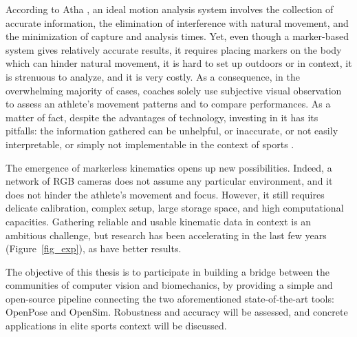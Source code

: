 According to Atha \cite{Atha1984}, an ideal motion analysis system involves the collection of accurate information, the elimination of interference with natural movement, and the minimization of capture and analysis times. Yet, even though a marker-based system gives relatively accurate results, it requires placing markers on the body which can hinder natural movement, it is hard to set up outdoors or in context, it is strenuous to analyze, and it is very costly. As a consequence, in the overwhelming majority of cases, coaches solely use subjective visual observation to assess an athlete's movement patterns and to compare performances. As a matter of fact, despite the advantages of technology, investing in it has its pitfalls: the information gathered can be unhelpful, or inaccurate, or not easily interpretable, or simply not implementable in the context of sports \cite{Windt2020}. 

The emergence of markerless kinematics opens up new possibilities. Indeed, a network of RGB cameras does not assume any particular environment, and it does not hinder the athlete’s movement and focus. However, it still requires delicate calibration, complex setup, large storage space, and high computational capacities. Gathering reliable and usable kinematic data in context is an ambitious challenge, but research has been accelerating in the last few years (Figure~\ref{fig_exp}), as have better results.

The objective of this thesis is to participate in building a bridge between the communities of computer vision and biomechanics, by providing a simple and open-source pipeline connecting the two aforementioned state-of-the-art tools: OpenPose and OpenSim. Robustness and accuracy will be assessed, and concrete applications in elite sports context will be discussed. 






